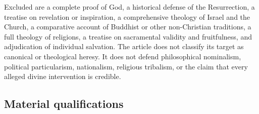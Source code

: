 Excluded are a complete proof of God, a historical defense of the Resurrection, a treatise on revelation or inspiration, a comprehensive theology of Israel and the Church, a comparative account of Buddhist or other non-Christian traditions, a full theology of religions, a treatise on sacramental validity and fruitfulness, and adjudication of individual salvation. The article does not classify its target as canonical or theological heresy. It does not defend philosophical nominalism, political particularism, nationalism, religious tribalism, or the claim that every alleged divine intervention is credible.

\subsection{Material qualifications}

